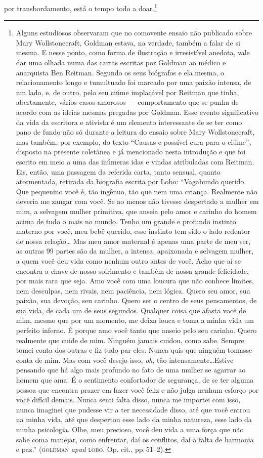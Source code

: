 por transbordamento, está o tempo todo a doar.\footnote{Alguns
  estudiosos observaram que no comovente ensaio não publicado sobre Mary
  Wollstonecraft, Goldman estava, na verdade, também a falar de si
  mesma. E nesse ponto, como forma de ilustração e irresistível anedota,
  vale dar uma olhada numa das cartas escritas por Goldman ao médico e
  anarquista Ben Reitman. Segundo os seus biógrafos e ela mesma, o
  relacionamento longo e tumultuado foi marcado por uma paixão intensa,
  de um lado, e, de outro, pelo seu ciúme implacável por Reitman que
  tinha, abertamente, vários casos amorosos --- comportamento que se
  punha de acordo com as ideias mesmas pregadas por Goldman. Esse evento
  significativo da vida da escritora e ativista é um elemento
  interessante de se ter como pano de fundo não só durante a leitura do
  ensaio sobre Mary Wollstonecraft, mas também, por exemplo, do texto
  ``Causas e possível cura para o ciúme'', disposto na presente
  coletânea e já mencionado nesta introdução e que foi escrito em meio a
  uma das inúmeras idas e vindas atribuladas com Reitman. Eis, então,
  uma passagem da referida carta, tanto sensual, quanto atormentada,
  retirada da biografia escrita por Lobo: ``Vagabundo querido. Que
  pequenino você é, tão ingênuo, tão que nem uma criança. Realmente não
  deveria me zangar com você. Se ao menos não tivesse despertado a
  mulher em mim, a selvagem mulher primitiva, que anseia pelo amor e
  carinho do homem acima de tudo o mais no mundo. Tenho um grande e
  profundo instinto materno por você, meu bebê querido, esse instinto
  tem sido o lado redentor de nossa relação\ldots{} Mas meu amor maternal é
  apenas uma parte de meu ser, as outras 99 partes são da mulher, a
  intensa, apaixonada e selvagem mulher, a quem você deu vida como
  nenhum outro antes de você. Acho que aí se encontra a chave de nosso
  sofrimento e também de nossa grande felicidade, por mais rara que
  seja. Amo você com uma loucura que não conhece limites, nem desculpas,
  nem rivais, nem paciência, nem lógica. Quero seu amor, sua paixão, sua
  devoção, seu carinho. Quero ser o centro de seus pensamentos, de sua
  vida, de cada um de seus segundos. Qualquer coisa que afasta você de
  mim, mesmo que por um momento, me deixa louca e toma a minha vida um
  perfeito inferno. É porque amo você tanto que anseio pelo seu carinho.
  Quero realmente que cuide de mim. Ninguém jamais cuidou, como sabe.
  Sempre tomei conta dos outras e fiz tudo par eles. Nunca quis que
  ninguém tomasse conta de mim. Mas com você desejo isso, \textit{oh}, tão
  intensamente\ldots Estive pensando que há algo mais profundo no fato de
  uma mulher se agarrar ao homem que ama. É o sentimento confortador de
  segurança, de se ter alguma pessoa que encontra prazer em fazer você
  feliz e não julga nenhum esforço por você difícil demais. Nunca senti
  falta disso, nunca me importei com isso, nunca imaginei que pudesse
  vir a ter necessidade disso, até que você entrou na minha vida, até
  que despertou esse lado da minha natureza, esse lado da minha
  psicologia. Olhe, meu precioso, você deu vida a uma força que não sabe
  coma manejar, como enfrentar, daí os conflitos, daí a falta de
  harmonia e paz.'' (\textsc{goldman} \textit{apud} \textsc{lobo}. Op. cit., pp.\,51--2).}


